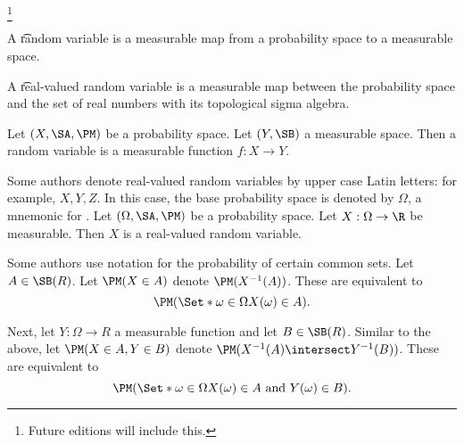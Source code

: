 

\footnote{Future editions will include this.}


A \t{random variable} is a measurable map from a probability space to a measurable space.

A \t{real-valued random variable} is a measurable map between the probability space and the set of real numbers with its topological sigma algebra.


Let $(X, \SA, \PM)$ be a probability space.
Let $(Y, \SB)$ a measurable space.
Then a random variable is a measurable function $f: X \to Y$.

Some authors denote real-valued random variables by upper case Latin letters:
for example, $X, Y, Z$.  In this case, the base probability space is denoted by $\Omega$, a mnemonic for .
Let $(\Omega,\SA,\PM)$ be a probability space.
Let $X: \Omega \to \R$ be measurable.
Then $X$ is a real-valued random variable.

Some authors use notation for the probability of certain common sets.
Let $A \in \SB(R)$.
Let $\PM(X \in A)$ denote $\PM(X^{-1}(A))$.
These are equivalent to
\[
  \PM(\Set*{\omega \in \Omega}{X(\omega) \in A}).
\]

Next, let $Y: \Omega \to R$
a measurable function and
let $B \in \SB(R)$.
Similar to the above,
let $\PM(X \in A,Y \in B)$
denote $\PM(X^{-1}(A) \intersect Y^{-1}(B))$.
These are equivalent to
\[
  \PM(\Set*{\omega \in \Omega}{X(\omega) \in A \text{ and } Y(\omega) \in B}).
\]
